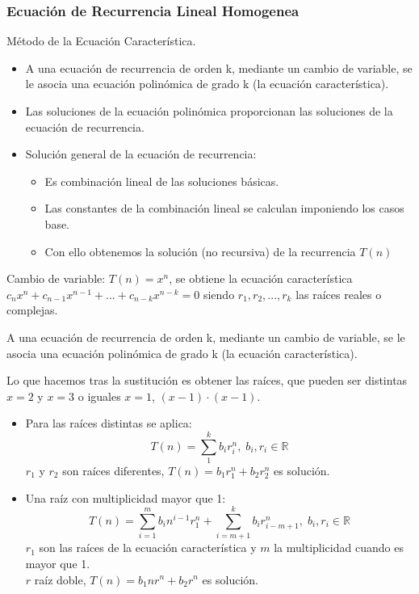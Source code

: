 \subsubsection{Ecuación de Recurrencia Lineal Homogenea}
Método de la Ecuación Característica.
\begin{itemize}
  \item A una ecuación de recurrencia de orden k, mediante un cambio de variable, se le asocia una ecuación polinómica de grado k (la ecuación característica).
  \item Las soluciones de la ecuación polinómica proporcionan las soluciones de la ecuación de recurrencia.
  \item Solución general de la ecuación de recurrencia:
  \begin{itemize}
    \item Es combinación lineal de las soluciones básicas.
    \item Las constantes de la combinación lineal se calculan imponiendo los casos base.
    \item Con ello obtenemos la solución (no recursiva) de la recurrencia $T(n)$
  \end{itemize}

\end{itemize}

Cambio de variable: $T(n)= x^n$, se obtiene la ecuación característica $c_n x^n+ c_{n-1}x^{n-1}+ ... + c_{n-k}x^{n-k} = 0$ siendo $r_1, r_2, ..., r_k$ las raíces reales o complejas.

A una ecuación de recurrencia de orden k, mediante un cambio de variable, se le asocia una ecuación polinómica de grado k (la ecuación característica).

Lo que hacemos tras la sustitución es obtener las raíces, que pueden ser distintas $x=2$ y $x=3$ o iguales $x=1$, $(x-1) \cdot (x-1)$.
\begin{itemize}
  \item Para las raíces distintas se aplica:
  $$T(n) = \sum _1 ^k b_i r_i^n, \; b_i, r_i \in \mathbb{R}$$
  $r_1$ y $r_2$ son raíces diferentes, $T(n)=b_1r_1^n+b_2r_2^n$ es solución.
  \item Una raíz con multiplicidad mayor que 1:
  $$T(n) = \sum _{i=1} ^m b_i n^{i-1}r_1^n+\sum _{i=m+1} ^k b_i r_{i-m+1}^n, \; b_i, r_i \in \mathbb{R}$$
  $r_1$ son las raíces de la ecuación característica y $m$ la multiplicidad cuando es mayor que 1.\\
  $r$  raíz doble, $T(n)=b_1nr^n+b_2r^n$ es solución.
\end{itemize}

